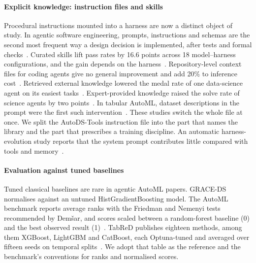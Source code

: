 \paragraph{Explicit knowledge: instruction files and skills} Procedural
instructions mounted into a harness are now a distinct object of study. In agentic software
engineering, prompts, instructions and schemas are the second most frequent
way a design decision is implemented, after tests and formal
checks~\citep{diazvillegas2026mapping}. Curated skills lift pass
rates by 16.6 points across 18 model--harness configurations, and the gain
depends on the harness~\citep{li2026skillsbench}. Repository-level context
files for coding agents give no general improvement and add 20\% to
inference cost~\citep{gloaguen2026agentsmd}. Retrieved external knowledge
lowered the medal rate of one data-science agent on its easiest
tasks~\citep{yang2025rdagent}. Expert-provided knowledge raised the solve
rate of science agents by two points~\citep{chen2025scienceagentbench}. In
tabular AutoML, dataset descriptions in the prompt were the first such
intervention~\citep{hollmann2023caafe}. These studies switch the whole file
at once. We split the AutoDS-Tools instruction file into the part that names
the library and the part that prescribes a training discipline. An
automatic harness-evolution study reports that the system prompt
contributes little compared with tools and memory~\citep{harness2026prompt}.

\paragraph{Evaluation against tuned baselines} Tuned classical
baselines are rare in agentic AutoML papers.
GRACE-DS normalises against an untuned HistGradientBoosting model. The AutoML
benchmark reports average ranks with the Friedman and Nemenyi tests
recommended by Dem\v{s}ar, and scores scaled between a random-forest
baseline (0) and the best observed result
(1)~\citep{gijsbers2024amlb,demsar2006statistical}. TabReD publishes
eighteen methods, among them XGBoost, LightGBM and CatBoost, each
Optuna-tuned and averaged over fifteen seeds on temporal
splits~\citep{rubachev2024tabred}. We adopt that table as the reference and
the benchmark's conventions for ranks and normalised scores.

